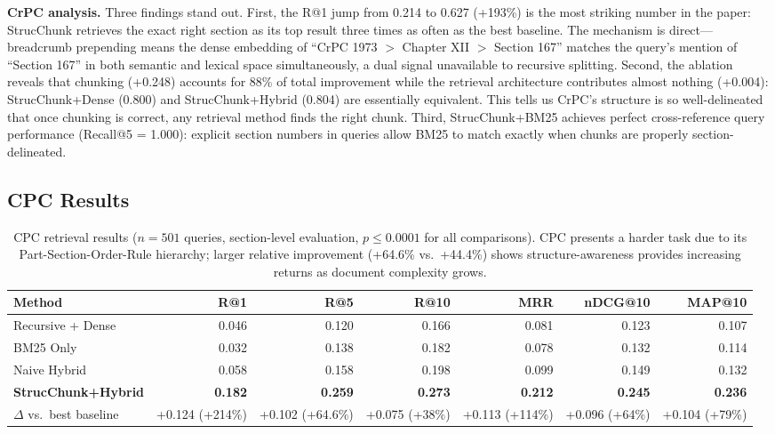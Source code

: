 \documentclass[sn-mathphys,Numbered]{sn-jnl}%
\begin{document}
\textbf{CrPC analysis.}  Three findings stand out.  First, the R@1 jump from 0.214 to 0.627 (+193\%) is the most striking number in the paper: StrucChunk retrieves the exact right section as its top result three times as often as the best baseline.  The mechanism is direct---breadcrumb prepending means the dense embedding of ``CrPC 1973 $>$ Chapter XII $>$ Section 167'' matches the query's mention of ``Section 167'' in both semantic and lexical space simultaneously, a dual signal unavailable to recursive splitting.  Second, the ablation reveals that chunking (+0.248) accounts for 88\% of total improvement while the retrieval architecture contributes almost nothing (+0.004): StrucChunk+Dense (0.800) and StrucChunk+Hybrid (0.804) are essentially equivalent.  This tells us CrPC's structure is so well-delineated that once chunking is correct, any retrieval method finds the right chunk.  Third, StrucChunk+BM25 achieves perfect cross-reference query performance (Recall@5 = 1.000): explicit section numbers in queries allow BM25 to match exactly when chunks are properly section-delineated.

\subsection{CPC Results}

\begin{table}[htbp]
\centering
\begin{adjustbox}{max width=\textwidth}
\begin{tabular}{lrrrrrr}
\toprule
\textbf{Method} & \textbf{R@1} & \textbf{R@5} & \textbf{R@10}
               & \textbf{MRR} & \textbf{nDCG@10} & \textbf{MAP@10} \\
\midrule
Recursive + Dense       & 0.046 & 0.120 & 0.166 & 0.081 & 0.123 & 0.107 \\
BM25 Only               & 0.032 & 0.138 & 0.182 & 0.078 & 0.132 & 0.114 \\
Naive Hybrid            & 0.058 & 0.158 & 0.198 & 0.099 & 0.149 & 0.132 \\
\textbf{StrucChunk+Hybrid} & \textbf{0.182} & \textbf{0.259}
                        & \textbf{0.273} & \textbf{0.212}
                        & \textbf{0.245} & \textbf{0.236} \\
\midrule
$\Delta$ vs.\ best baseline & +0.124 (+214\%) & +0.102 (+64.6\%)
                        & +0.075 (+38\%) & +0.113 (+114\%)
                        & +0.096 (+64\%) & +0.104 (+79\%) \\
\bottomrule
\end{tabular}
\end{adjustbox}
\caption{CPC retrieval results ($n=501$ queries, section-level evaluation,
  $p \leq 0.0001$ for all comparisons).  CPC presents a harder task
  due to its Part-Section-Order-Rule hierarchy; larger relative improvement
  (+64.6\% vs.\ +44.4\%) shows structure-awareness provides increasing
  returns as document complexity grows.}
\label{tab:cpc_results}
\end{table}
\end{document}
